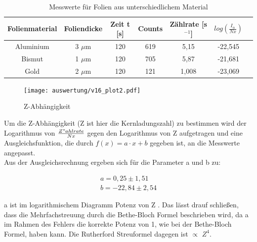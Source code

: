 \begin{table}[H]
\centering
\begin{tabular}{c|c c c c c c}

	Folienmaterial & Foliendicke & Zeit t [s]& Counts & Zählrate [s$^{-1}$] & $log(\frac{I_\alpha}{Nx})$ \\
	\hline
	Aluminium & 3 $\mu$m & 120  & 619 & 5,15 & -22,545 \\

	Bismut &1 $\mu$m & 120 & 705 & 5,87 & -21,681\\

	Gold & 2 $\mu$m & 120 & 121 & 1,008 & -23,069\\

\end{tabular}
	\caption{Messwerte für Folien aus unterschiedlichem Material}
	\label{tab:werte}
\end{table}


\begin{figure}[H]
	\centering
	\texttt{[image: auswertung/v16\_plot2.pdf]}
	\caption{Z-Abhängigkeit}
	\label{img:grafik-dummy}
\end{figure}

Um die Z-Abhängigkeit (Z ist hier die Kernladungszahl) zu bestimmen wird der Logarithmus von $\frac{Z"ahlrate}{Nx}$ gegen den Logarithmus von Z aufgetragen und eine Ausgleichsfunktion, die durch $f(x)=a\cdot x+b$ gegeben ist, an die Messwerte angepasst. \\
Aus der Ausgleichsrechnung ergeben sich für die Parameter a und b zu:

\begin{align*}
a= 0,25 \pm 1,51
\\
b= -22,84 \pm 2,54
\end{align*}

a ist im logarithmischem Diagramm Potenz von Z . Das lässt drauf schließen, dass die Mehrfachstreuung durch die Bethe-Bloch Formel beschrieben wird, da a im Rahmen des Fehlers die korrekte Potenz von 1, wie bei der Bethe-Bloch Formel, haben kann. Die Rutherford Streuformel dagegen ist $\propto$ $Z^4$.
